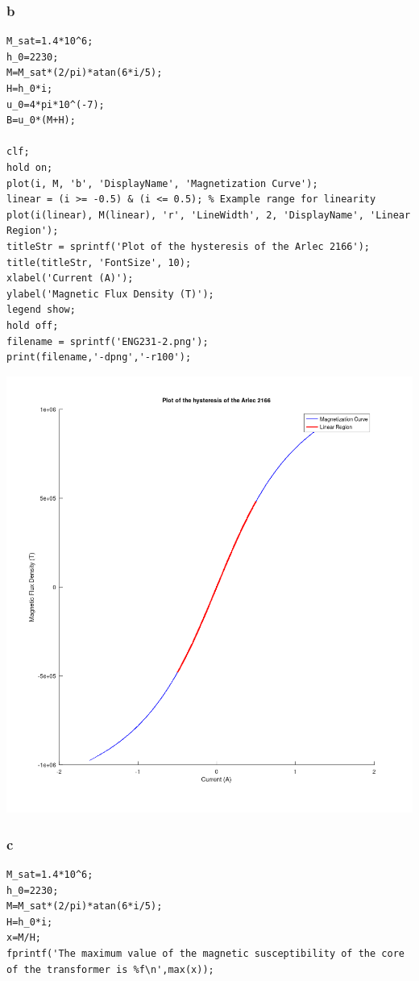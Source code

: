 \documentclass[11pt]{article}
\begin{document}
\subsubsection{b}
\label{sec:org3ae25fe}
\begin{verbatim}
M_sat=1.4*10^6;
h_0=2230;
M=M_sat*(2/pi)*atan(6*i/5);
H=h_0*i;
u_0=4*pi*10^(-7);
B=u_0*(M+H);

clf;
hold on;
plot(i, M, 'b', 'DisplayName', 'Magnetization Curve');
linear = (i >= -0.5) & (i <= 0.5); % Example range for linearity
plot(i(linear), M(linear), 'r', 'LineWidth', 2, 'DisplayName', 'Linear Region');
titleStr = sprintf('Plot of the hysteresis of the Arlec 2166');
title(titleStr, 'FontSize', 10);
xlabel('Current (A)');
ylabel('Magnetic Flux Density (T)');
legend show;
hold off;
filename = sprintf('ENG231-2.png');
print(filename,'-dpng','-r100');
\end{verbatim}


\begin{center}
\includegraphics[width=.9\linewidth]{ENG231-2.png}
\end{center}
\subsubsection{c}
\label{sec:orgbefebdc}
\begin{verbatim}
M_sat=1.4*10^6;
h_0=2230;
M=M_sat*(2/pi)*atan(6*i/5);
H=h_0*i;
x=M/H;
fprintf('The maximum value of the magnetic susceptibility of the core of the transformer is %f\n',max(x));
\end{verbatim}
\end{document}
